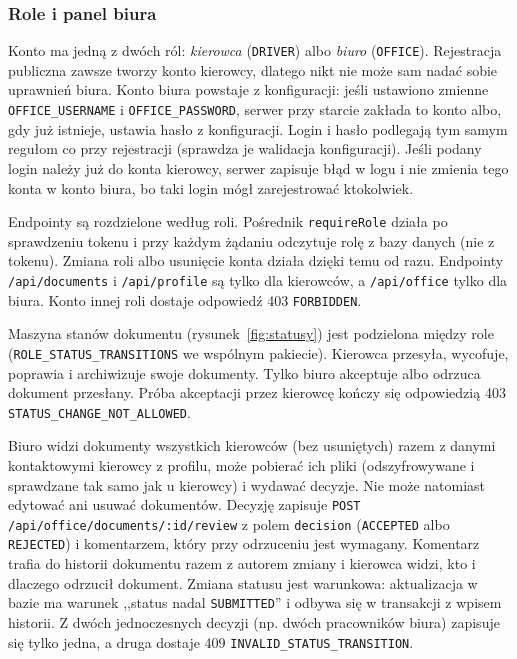 \subsubsection{Role i panel biura}
\label{sec:role}

Konto ma jedną z dwóch ról: \emph{kierowca} (\texttt{DRIVER}) albo
\emph{biuro} (\texttt{OFFICE}). Rejestracja publiczna zawsze tworzy konto
kierowcy, dlatego nikt nie może sam nadać sobie uprawnień biura. Konto biura
powstaje z konfiguracji: jeśli ustawiono zmienne \texttt{OFFICE\_USERNAME}
i \texttt{OFFICE\_PASSWORD}, serwer przy starcie zakłada to konto albo, gdy
już istnieje, ustawia hasło z konfiguracji. Login i hasło podlegają tym samym
regułom co przy rejestracji (sprawdza je walidacja konfiguracji). Jeśli podany
login należy już do konta kierowcy, serwer zapisuje błąd w logu i nie zmienia
tego konta w konto biura, bo taki login mógł zarejestrować ktokolwiek.

Endpointy są rozdzielone według roli. Pośrednik \texttt{requireRole} działa po
sprawdzeniu tokenu i przy każdym żądaniu odczytuje rolę z bazy danych (nie
z tokenu). Zmiana roli albo usunięcie konta działa dzięki temu od razu. Endpointy
\texttt{/api/documents} i \texttt{/api/profile} są tylko dla kierowców,
a \texttt{/api/office} tylko dla biura. Konto innej roli dostaje odpowiedź
403 \texttt{FORBIDDEN}.

Maszyna stanów dokumentu (rysunek~\ref{fig:statusy}) jest podzielona między
role (\texttt{ROLE\_STATUS\_TRANSITIONS} we wspólnym pakiecie). Kierowca
przesyła, wycofuje, poprawia i archiwizuje swoje dokumenty. Tylko biuro
akceptuje albo odrzuca dokument przesłany. Próba akceptacji przez kierowcę
kończy się odpowiedzią 403 \texttt{STATUS\_CHANGE\_NOT\_ALLOWED}.

Biuro widzi dokumenty wszystkich kierowców (bez usuniętych) razem z danymi
kontaktowymi kierowcy z profilu, może pobierać ich pliki (odszyfrowywane
i sprawdzane tak samo jak u kierowcy) i wydawać decyzje. Nie może natomiast
edytować ani usuwać dokumentów. Decyzję zapisuje
\texttt{POST /api/office/documents/:id/review} z polem \texttt{decision}
(\texttt{ACCEPTED} albo \texttt{REJECTED}) i komentarzem, który przy
odrzuceniu jest wymagany. Komentarz trafia do historii dokumentu razem
z autorem zmiany i kierowca widzi, kto i dlaczego odrzucił dokument.
Zmiana statusu jest warunkowa: aktualizacja w bazie ma warunek
,,status nadal \texttt{SUBMITTED}'' i odbywa się w transakcji z wpisem
historii. Z dwóch jednoczesnych decyzji (np. dwóch pracowników biura)
zapisuje się tylko jedna, a druga dostaje 409 \texttt{INVALID\_STATUS\_TRANSITION}.

